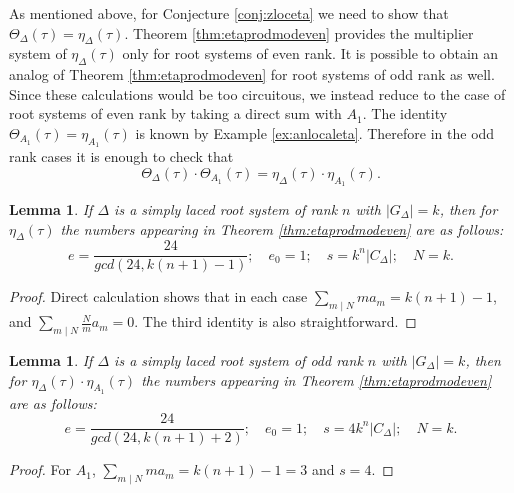 \documentclass[11pt,a4paper]{amsart}
\newtheorem{lemma}[theorem]{Lemma}
\theoremstyle{definition}
\begin{document}
As mentioned above, for Conjecture \ref{conj:zloceta} we need to show that $\Theta_{\Delta}(\tau)=\eta_{\Delta}(\tau)$. Theorem \ref{thm:etaprodmodeven} provides the multiplier system of $\eta_{\Delta}(\tau)$ only for root systems of even rank. It is possible to obtain an analog of Theorem \ref{thm:etaprodmodeven} for root systems of odd rank as well. Since these calculations would be too circuitous, we instead reduce to the case of root systems of even rank by taking a direct sum with $A_1$. The identity $\Theta_{A_1}(\tau)=\eta_{A_1}(\tau)$ is known by Example \ref{ex:anlocaleta}. Therefore in the odd rank cases it is enough to check that 
\[\Theta_{\Delta}(\tau)\cdot \Theta_{A_1}(\tau)=\eta_{\Delta}(\tau)\cdot \eta_{A_1}(\tau).\]	
\begin{lemma}
\label{lem:ee0s}
If $\Delta$ is a simply laced root system of rank $n$ with $|G_{\Delta}|=k$, then for $\eta_{\Delta}(\tau)$ the numbers appearing in Theorem \ref{thm:etaprodmodeven}	 are as follows:
\[ e=\frac{24}{gcd(24, k(n+1)-1)}; \quad e_0=1; \quad s=k^n|C_{\Delta}|; \quad N=k. \]
\end{lemma}
\begin{proof} Direct calculation shows that in each case $\sum_{m \mid N} ma_m=k(n+1)-1$, and $\sum_{m \mid N} \frac{N}{m}a_m=0$. The third identity is also straightforward.
\end{proof}
\begin{lemma}
\label{lem:ee0sa1}
 If $\Delta$ is a simply laced root system of odd rank $n$ with $|G_{\Delta}|=k$, then for $\eta_{\Delta}(\tau) \cdot \eta_{A_1}(\tau)$ the numbers appearing in Theorem \ref{thm:etaprodmodeven} are as follows:
\[ e=\frac{24}{gcd(24, k(n+1)+2)}; \quad e_0=1; \quad s=4k^n|C_{\Delta}|; \quad N=k. \]
\end{lemma}
\begin{proof} For $A_1$, $\sum_{m \mid N} ma_m=k(n+1)-1=3$ and $s=4$. \end{proof}
\end{document}
